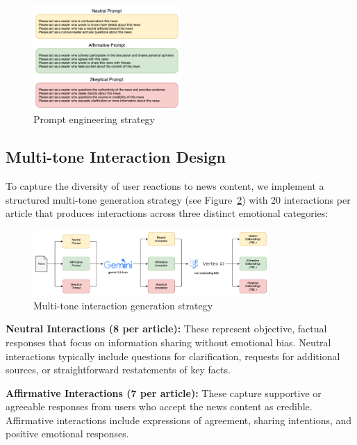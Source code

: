 \begin{figure}[h]
    \centering
    \includegraphics[width=0.5\textwidth]{context/methodology/fig/prompt.png}
    \caption{Prompt engineering strategy}
    \label{fig:prompt}
\end{figure}

\subsection{Multi-tone Interaction Design}

To capture the diversity of user reactions to news content, we implement a structured multi-tone generation strategy (see Figure~\ref{fig:interaction-generation}) with 20 interactions per article that produces interactions across three distinct emotional categories:

\begin{figure}[h]
    \centering
    \includegraphics[width=0.8\textwidth]{context/methodology/fig/user_interaction_generation.png}
    \caption{Multi-tone interaction generation strategy}
    \label{fig:interaction-generation}
\end{figure}

\textbf{Neutral Interactions (8 per article):} These represent objective, factual responses that focus on information sharing without emotional bias. Neutral interactions typically include questions for clarification, requests for additional sources, or straightforward restatements of key facts.

\textbf{Affirmative Interactions (7 per article):} These capture supportive or agreeable responses from users who accept the news content as credible. Affirmative interactions include expressions of agreement, sharing intentions, and positive emotional responses.

